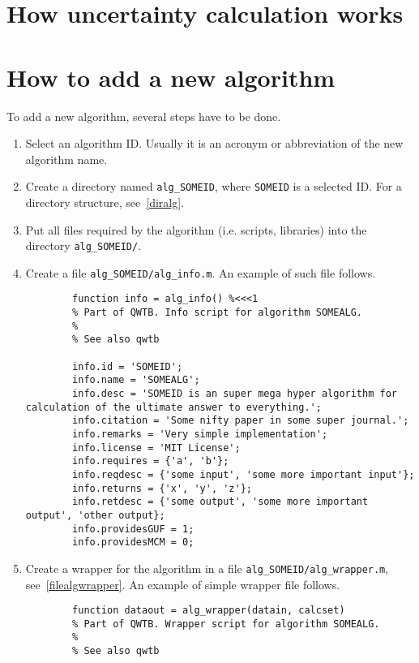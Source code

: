 \documentclass[12pt,a4paper,oneside]{report} %
\begin{document}
\section{How uncertainty calculation works} %

\section{How to add a new algorithm} %
To add a new algorithm, several steps have to be done.

\begin{enumerate}
        \item Select an algorithm ID. Usually it is an acronym or abbreviation of the new algorithm name.

        \item Create a directory named {\tt alg\_SOMEID}, where {\tt SOMEID} is a selected ID. For a
        directory structure, see~\ref{diralg}.

        \item Put all files required by the algorithm (i.e. scripts, libraries) into the directory
        {\tt alg\_SOMEID/}.

        \item Create a file {\tt alg\_SOMEID/alg\_info.m}. An example of such file follows.
        \begin{lstlisting}
        function info = alg_info() %<<<1
        % Part of QWTB. Info script for algorithm SOMEALG.
        %
        % See also qwtb

        info.id = 'SOMEID';
        info.name = 'SOMEALG';
        info.desc = 'SOMEID is an super mega hyper algorithm for calculation of the ultimate answer to everything.';
        info.citation = 'Some nifty paper in some super journal.';
        info.remarks = 'Very simple implementation';
        info.license = 'MIT License';
        info.requires = {'a', 'b'};
        info.reqdesc = {'some input', 'some more important input'};
        info.returns = {'x', 'y', 'z'};
        info.retdesc = {'some output', 'some more important output', 'other output};
        info.providesGUF = 1;
        info.providesMCM = 0;
        \end{lstlisting}

        \item Create a wrapper for the algorithm in a file {\tt alg\_SOMEID/alg\_wrapper.m}, see~\ref{filealgwrapper}. An example of simple wrapper
        file follows.
        \begin{lstlisting}
        function dataout = alg_wrapper(datain, calcset)
        % Part of QWTB. Wrapper script for algorithm SOMEALG.
        %
        % See also qwtb


\end{lstlisting}
\end{enumerate}
\end{document}
